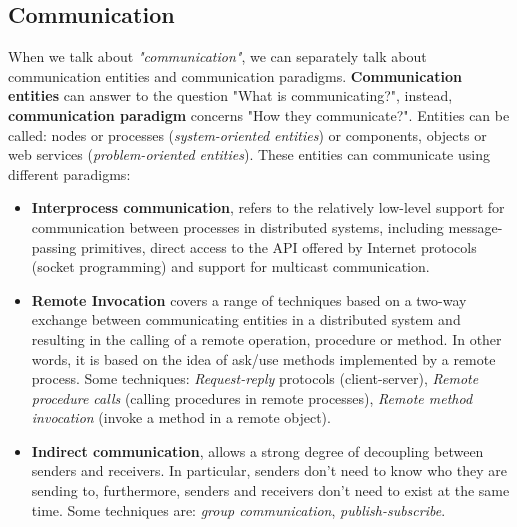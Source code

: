 \documentclass[11pt,a4paper]{article}
\begin{document}
\subsection{Communication}
When we talk about \textit{"communication"}, we can separately talk about communication entities and communication paradigms. \textbf{Communication entities} can answer to the question "What is communicating?", instead, \textbf{communication paradigm} concerns "How they communicate?". Entities can be called: nodes or processes (\textit{system-oriented entities}) or components, objects or web services (\textit{problem-oriented entities}).
These entities can communicate using different paradigms: 
\begin{itemize}
    \item \textbf{Interprocess communication}, refers to the relatively low-level support for communication between processes in distributed systems, including message-passing primitives, direct access to the API offered by Internet protocols (socket programming) and support for multicast communication.
    \item \textbf{Remote Invocation} covers a range of techniques based on a two-way exchange between communicating entities in a distributed system and resulting in the calling of a remote operation, procedure or method. In other words, it is based on the idea of ask/use methods implemented by a remote process. Some techniques: \textit{Request-reply} protocols (client-server), \textit{Remote procedure calls} (calling procedures in remote processes), \textit{Remote method invocation} (invoke a method in a remote object).
    \item \textbf{Indirect communication}, allows a strong degree of decoupling between senders and receivers. In particular, senders don't need to know who they are sending to, furthermore, senders and receivers don't need to exist at the same time. Some techniques are: \textit{group communication}, \textit{publish-subscribe}.
\end{itemize}
\end{document}
